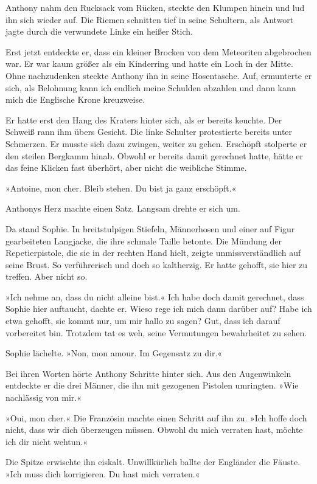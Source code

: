 Anthony nahm den Rucksack vom Rücken, steckte den Klumpen hinein
und lud ihn sich wieder auf. Die Riemen schnitten tief in seine
Schultern, als Antwort jagte durch die verwundete Linke ein heißer
Stich.

Erst jetzt entdeckte er, dass ein kleiner Brocken von dem
Meteoriten abgebrochen war. Er war kaum größer als ein Kinderring
und hatte ein Loch in der Mitte. Ohne nachzudenken steckte Anthony
ihn in seine Hosentasche. Auf, ermunterte er sich, als Belohnung
kann ich endlich meine Schulden abzahlen und dann kann mich die
Englische Krone kreuzweise.

Er hatte erst den Hang des Kraters hinter sich, als er bereits
keuchte. Der Schweiß rann ihm übers Gesicht. Die linke Schulter
protestierte bereits unter Schmerzen. Er musste sich dazu zwingen,
weiter zu gehen. Erschöpft stolperte er den steilen Bergkamm hinab.
Obwohl er bereits damit gerechnet hatte, hätte er das feine Klicken
fast überhört, aber nicht die weibliche Stimme.

»Antoine, mon cher. Bleib stehen. Du bist ja ganz erschöpft.«

Anthonys Herz machte einen Satz. Langsam drehte er sich um.

Da stand Sophie. In breitstulpigen Stiefeln, Männerhosen und einer
auf Figur gearbeiteten Langjacke, die ihre schmale Taille betonte.
Die Mündung der Repetierpistole, die sie in der rechten Hand hielt,
zeigte unmissverständlich auf seine Brust. So verführerisch und
doch so kaltherzig. Er hatte gehofft, sie hier zu treffen. Aber
nicht so.

»Ich nehme an, dass du nicht alleine bist.« Ich habe doch damit
gerechnet, dass Sophie hier auftaucht, dachte er. Wieso rege ich
mich dann darüber auf? Habe ich etwa gehofft, sie kommt nur, um mir
hallo zu sagen? Gut, dass ich darauf vorbereitet bin. Trotzdem tat
es weh, seine Vermutungen bewahrheitet zu sehen.

Sophie lächelte. »Non, mon amour. Im Gegensatz zu dir.«

Bei ihren Worten hörte Anthony Schritte hinter sich. Aus den
Augenwinkeln entdeckte er die drei Männer, die ihn mit gezogenen
Pistolen umringten. »Wie nachlässig von mir.«

»Oui, mon cher.« Die Französin machte einen Schritt auf ihn zu.
»Ich hoffe doch nicht, dass wir dich überzeugen müssen. Obwohl du
mich verraten hast, möchte ich dir nicht wehtun.«

Die Spitze erwischte ihn eiskalt. Unwillkürlich ballte der
Engländer die Fäuste. »Ich muss dich korrigieren. Du hast mich
verraten.«

